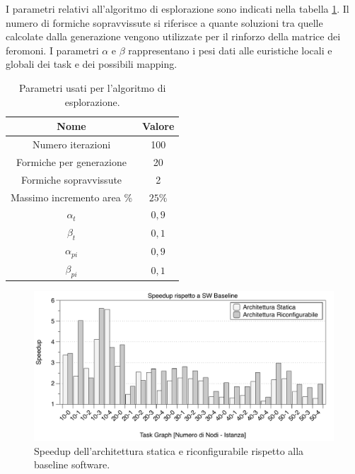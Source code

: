 I parametri relativi all'algoritmo di esplorazione sono indicati nella tabella \ref{tab:parametriACO}.
Il numero di formiche sopravvissute si riferisce a quante soluzioni tra quelle calcolate dalla generazione
vengono utilizzate per il rinforzo della matrice dei feromoni. I parametri $\alpha$ e $\beta$
rappresentano i pesi dati alle euristiche locali e globali dei task e dei possibili mapping.


\begin{table}[t]
  \begin{center}
    \begin{tabular}{|c|c|}
      \hline
      \textbf{Nome} & \textbf{Valore}\\
      \hline
      Numero iterazioni & 100\\
      \hline
      Formiche per generazione & 20\\
      \hline
      Formiche sopravvissute & 2\\
      \hline
      Massimo incremento area \% & $25\%$\\
      \hline
      $\alpha_t$ & $0,9$\\
      \hline
      $\beta_t$ & $0,1$\\
      \hline
      $\alpha_{pi}$ & $0,9$\\
      \hline
      $\beta_{pi}$ & $0,1$\\
      \hline
    \end{tabular}
    \caption{Parametri usati per l'algoritmo di esplorazione.}
    \label{tab:parametriACO}
  \end{center}
\end{table}

\begin{figure}[t]
 \begin{center}
  \includegraphics[width=\textwidth]{./capitoli/figure/cap6/FPL_makespan.pdf}
  \caption{Speedup dell'architettura statica e riconfigurabile rispetto alla
  baseline software.}
  \label{fig:speedupBaseline}
 \end{center}
\end{figure}

